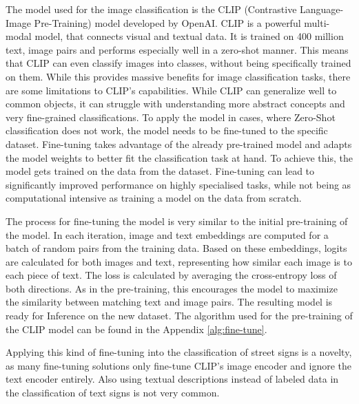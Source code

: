 \documentclass{article}
\begin{document}
The model used for the image classification is the CLIP (Contrastive Language-Image Pre-Training) model developed by OpenAI. \cite{radford2021learningtransferablevisualmodels} CLIP is a powerful multi-modal model, that connects visual and textual data. It is trained on 400 million text, image pairs and performs especially well in a zero-shot manner. This means that CLIP can even classify images into classes, without being specifically trained on them. While this provides massive benefits for image classification tasks, there are some limitations to CLIP's capabilities. While CLIP can generalize well to common objects, it can struggle with understanding more abstract concepts and very fine-grained classifications. To apply the model in cases, where Zero-Shot classification does not work, the model needs to be fine-tuned to the specific dataset. \cite{goyal2022finetunelikepretrainimproved} Fine-tuning takes advantage of the already pre-trained model and adapts the model weights to better fit the classification task at hand. To achieve this, the model gets trained on the data from the dataset. Fine-tuning can lead to significantly improved performance on highly specialised tasks, while not being as computational intensive as training a model on the data from scratch.

The process for fine-tuning the model is very similar to the initial pre-training of the model. \cite{goyal2022finetunelikepretrainimproved} In each iteration, image and text embeddings are computed for a batch of random pairs from the training data. Based on these embeddings, logits are calculated for both images and text, representing how similar each image is to each piece of text. The loss is calculated by averaging the cross-entropy loss of both directions. As in the pre-training, this encourages the model to maximize the similarity between matching text and image pairs. The resulting model is ready for Inference on the new dataset. The algorithm used for the pre-training of the CLIP model can be found in the Appendix \ref{alg:fine-tune}.

Applying this kind of fine-tuning into the classification of street signs is a novelty, as many fine-tuning solutions only fine-tune CLIP's image encoder and ignore the text encoder entirely. Also using textual descriptions instead of labeled data in the classification of text signs is not very common.
\FloatBarrier
\end{document}
